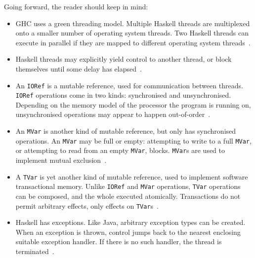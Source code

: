 Going forward, the reader should keep in mind:

\begin{itemize}
\item GHC uses a green threading model.  Multiple Haskell threads are
  multiplexed onto a smaller number of operating system threads.  Two
  Haskell threads can execute in parallel if they are mapped to
  different operating system
  threads~.


\item Haskell threads may explicitly yield control to another thread,
  or block themselves until some delay has
  elapsed~.

\item An \verb|IORef| is a mutable reference, used for communication
  between threads.  \verb|IORef| operations come in two kinds:
  synchronised and unsynchronised.  Depending on the memory model of
  the processor the program is running on, unsynchronised operations
  may appear to happen out-of-order~.

\item An \verb|MVar| is another kind of mutable reference, but only
  has synchronised operations.  An \verb|MVar| may be full or empty:
  attempting to write to a full \verb|MVar|, or attempting to read
  from an empty \verb|MVar|, blocks.  \verb|MVar|s are used to
  implement mutual exclusion~.

\item A \verb|TVar| is yet another kind of mutable reference, used to
  implement software transactional memory.  Unlike \verb|IORef| and
  \verb|MVar| operations, \verb|TVar| operations can be composed, and
  the whole executed atomically.  Transactions do not permit arbitrary
  effects, only effects on \verb|TVar|s~.

\item Haskell has exceptions.  Like Java, arbitrary exception types
  can be created.  When an exception is thrown, control jumps back to
  the nearest enclosing suitable exception handler.  If there is no
  such handler, the thread is
  terminated~.


\end{itemize}
